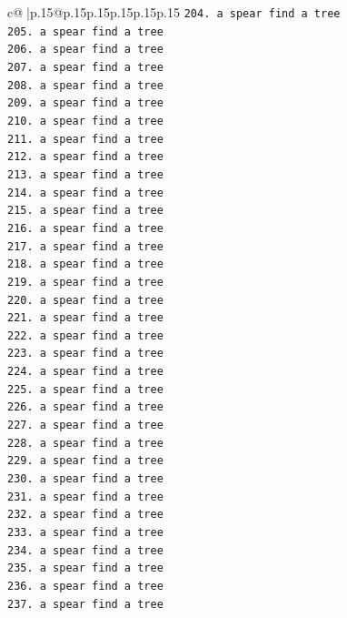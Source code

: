 \documentclass{article}
\begin{document}
{\begin{supertabular}{c@{$\;$}|p{.15\linewidth}@{}p{.15\linewidth}p{.15\linewidth}p{.15\linewidth}p{.15\linewidth}p{.15\linewidth}}
{{{\texttt{204. a spear find a tree} \\
\texttt{205. a spear find a tree} \\
\texttt{206. a spear find a tree} \\
\texttt{207. a spear find a tree} \\
\texttt{208. a spear find a tree} \\
\texttt{209. a spear find a tree} \\
\texttt{210. a spear find a tree} \\
\texttt{211. a spear find a tree} \\
\texttt{212. a spear find a tree} \\
\texttt{213. a spear find a tree} \\
\texttt{214. a spear find a tree} \\
\texttt{215. a spear find a tree} \\
\texttt{216. a spear find a tree} \\
\texttt{217. a spear find a tree} \\
\texttt{218. a spear find a tree} \\
\texttt{219. a spear find a tree} \\
\texttt{220. a spear find a tree} \\
\texttt{221. a spear find a tree} \\
\texttt{222. a spear find a tree} \\
\texttt{223. a spear find a tree} \\
\texttt{224. a spear find a tree} \\
\texttt{225. a spear find a tree} \\
\texttt{226. a spear find a tree} \\
\texttt{227. a spear find a tree} \\
\texttt{228. a spear find a tree} \\
\texttt{229. a spear find a tree} \\
\texttt{230. a spear find a tree} \\
\texttt{231. a spear find a tree} \\
\texttt{232. a spear find a tree} \\
\texttt{233. a spear find a tree} \\
\texttt{234. a spear find a tree} \\
\texttt{235. a spear find a tree} \\
\texttt{236. a spear find a tree} \\
\texttt{237. a spear find a tree} \\
}}}
\end{supertabular}}
\end{document}
